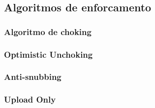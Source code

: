 
\subsection*{Algoritmos de enforcamento}

\subsubsection*{Algoritmo de choking}

\subsubsection*{Optimistic Unchoking}

\subsubsection*{Anti-snubbing}

\subsubsection*{Upload Only}